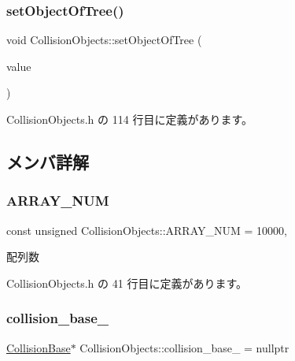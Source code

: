 \subsubsection{\texorpdfstring{set\+Object\+Of\+Tree()}{setObjectOfTree()}}
{\footnotesize\ttfamily void Collision\+Objects\+::set\+Object\+Of\+Tree (\begin{DoxyParamCaption}\item[{\mbox{\hyperlink{class_object_of_tree}{Object\+Of\+Tree}}$<$ \mbox{\hyperlink{class_collision_objects}{Collision\+Objects}} $\ast$$>$ $\ast$}]{value }\end{DoxyParamCaption})\hspace{0.3cm}{\ttfamily [inline]}}



 Collision\+Objects.\+h の 114 行目に定義があります。



\subsection{メンバ詳解}
\mbox{\label{class_collision_objects_a907cb151a9bbdd323eba56a4e4e1ee76}} 
\subsubsection{\texorpdfstring{A\+R\+R\+A\+Y\+\_\+\+N\+UM}{ARRAY\_NUM}}
{\footnotesize\ttfamily const unsigned Collision\+Objects\+::\+A\+R\+R\+A\+Y\+\_\+\+N\+UM = 10000\hspace{0.3cm}{\ttfamily [static]}, {\ttfamily [private]}}



配列数 



 Collision\+Objects.\+h の 41 行目に定義があります。

\mbox{\label{class_collision_objects_a03e2ef7152dac946f5bbf887d9e190b1}} 
\subsubsection{\texorpdfstring{collision\+\_\+base\+\_\+}{collision\_base\_}}
{\footnotesize\ttfamily \mbox{\hyperlink{class_collision_base}{Collision\+Base}}$\ast$ Collision\+Objects\+::collision\+\_\+base\+\_\+ = nullptr\hspace{0.3cm}{\ttfamily [private]}}



